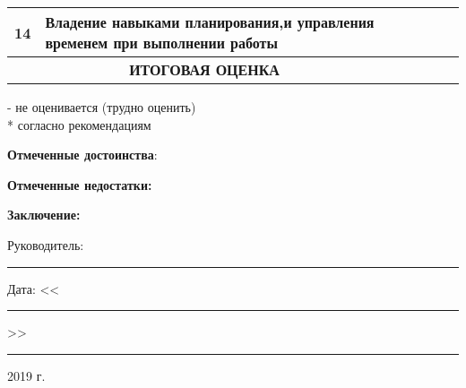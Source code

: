 \begin{table}[h]
{\begin{tabular}{|c|l|l|l|l|l|}
		14                 & Владение навыками планирования,и управления временем при выполнении работы                                                                                                                 &       &       &      &      \\ \hline
		\multicolumn{2}{|c|}{\textbf{ИТОГОВАЯ ОЦЕНКА}}                                                                                                                                                                                     & \multicolumn{4}{l|}{}       \\ \hline
	\end{tabular}}

{\tiny * - не оценивается (трудно оценить)}\\
{\tiny ** согласно рекомендациям}
\end{table}

\newpage
\thispagestyle{empty}

\textbf{Отмеченные достоинства}: \hrulefill

\hrulefill

\hrulefill

\hrulefill

\hrulefill

\hrulefill

\hrulefill

\hrulefill

\hrulefill

\hrulefill

\hrulefill

\hrulefill

\hrulefill

\textbf{Отмеченные недостатки:} \hrulefill

\hrulefill

\hrulefill

\hrulefill

\hrulefill

\hrulefill

\hrulefill

\hrulefill

\hrulefill

\hrulefill

\hrulefill

\hrulefill

\textbf{Заключение:}  \hrulefill

\hrulefill

\hrulefill

\hrulefill

\hrulefill

\hrulefill

\hrulefill

Руководитель: \rule{10em}{.1pt}

Дата: <<\rule{2em}{.1pt}>> \rule{6em}{.1pt} 2019 г.